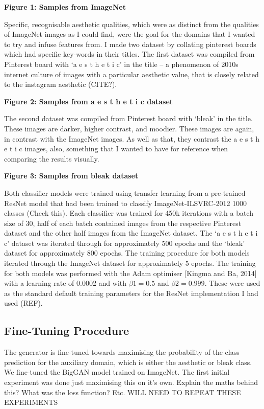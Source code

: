 \textbf{Figure 1: Samples from ImageNet}

Specific, recognisable aesthetic qualities, which were as distinct from the qualities of ImageNet images as I could find, were the goal for the domains that I wanted to try and infuse features from. 
I made two dataset by collating pinterest boards which had specific key-words in their titles. 
The first dataset was compiled from Pinterest board with ‘a e s t h e t i c’ in the title -- a phenomenon of 2010s internet culture of images with a particular aesthetic value, that is closely related to the instagram aesthetic (CITE?). 

\textbf{Figure 2: Samples from a e s t h e t i c dataset}

The second dataset was compiled from Pinterest board with ‘bleak’ in the title. 
These images are darker, higher contrast, and moodier. These images are again, in contrast with the ImageNet images. 
As well as that, they contrast the a e s t h e t i c images, also, something that I wanted to have for reference when comparing the results visually. 

\textbf{Figure 3: Samples from bleak dataset}

Both classifier models were trained using transfer learning from a pre-trained ResNet \citep{he2016deep} model that had been trained to classify ImageNet-ILSVRC-2012 1000 classes (Check this). 
Each classifier was trained for 450k iterations with a batch size of 30, half of each batch contained images from the respective Pinterest dataset and the other half images from the ImageNet dataset. 
The ‘a e s t h e t i c’ dataset was iterated through for approximately 500 epochs and the ‘bleak’ dataset for approximately 800 epochs. 
The training procedure for both models iterated through the ImageNet dataset for approximately 5 epochs. 
The training for both models was performed with the Adam optimiser [Kingma and Ba, 2014] with a learning rate of 0.0002 and with $\beta 1 = 0.5$ and $\beta 2 = 0.999$. 
These were used as the standard default training parameters for the ResNet implementation I had used (REF).

\subsection{Fine-Tuning Procedure}

The generator is fine-tuned towards maximising the probability of the class prediction for the auxiliary domain, which is either the aesthetic or bleak class. We fine-tuned the BigGAN model trained on ImageNet. The first initial experiment was done just maximising this on it’s own. Explain the maths behind this? What was the loss function? Etc.  WILL NEED TO REPEAT THESE EXPERIMENTS 

